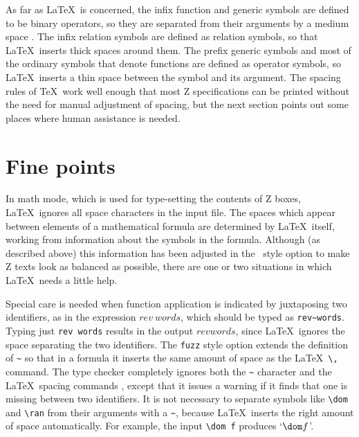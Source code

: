 As far as \LaTeX\ is concerned, the infix function and generic
symbols are defined to be binary operators, so they are separated
from their arguments by a medium space%
.  The infix relation symbols are
defined as relation symbols, so that \LaTeX\ inserts thick spaces
around them.  The prefix generic symbols and most of the ordinary
symbols that denote functions are defined as operator symbols, so
\LaTeX\ inserts a thin space between the symbol and its argument.
The spacing rules of \TeX\ work well enough that most Z
specifications can be printed without the need for manual adjustment
of spacing, but the next section points out some places where human
assistance is needed.

\section{Fine points}\label{finepts}

In math mode, which is used for type-setting the contents of Z boxes, 
\LaTeX\ ignores all space characters in the input file. The spaces which
appear between elements of a mathematical formula are determined by
\LaTeX\ itself, working from information about the symbols in the
formula. Although (as described above) this information has been
adjusted in the \fuzz\ style option to make Z texts look as balanced
as possible, there are one or two situations in which \LaTeX\ needs a
little help.

Special care is needed when function application is indicated by
juxtaposing two identifiers, as in the expression
$rev~words$, which
should be typed as \verb/rev~words/.%
 Typing just 
\verb/rev words/ results in the output $rev words$, since \LaTeX\
ignores the space separating the two identifiers.  The \verb/fuzz/
style option extends the definition of \verb/~/ so that in a formula
it inserts the same amount of space as the \LaTeX\
\verb/\,/ command.  The type checker completely ignores both the
\verb/~/ character and the \LaTeX\ spacing commands%
\index{space commands: ignored by type checker}, except that it
issues a warning if it finds that one is missing between
two identifiers.  It is not necessary to separate 
symbols like \verb/\dom/ and \verb/\ran/ from their arguments with a
\verb/~/, because \LaTeX\ inserts the right amount of space
automatically. For example, the input \verb/\dom f/ produces 
`$\dom f$'.

